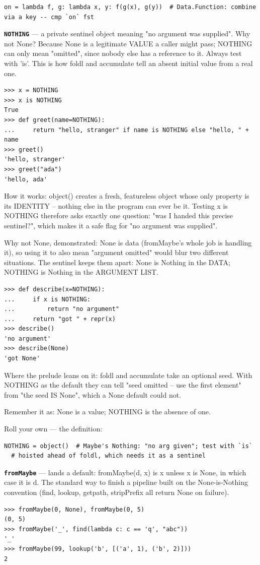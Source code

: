 \documentclass[10pt,letterpaper]{article}
\begin{document}
\begin{lstlisting}[style=ex]
on = lambda f, g: lambda x, y: f(g(x), g(y))  # Data.Function: combine via a key -- cmp `on` fst
\end{lstlisting}
\textbf{\texttt{NOTHING}} --- a private sentinel object meaning "no argument was supplied". Why not None? Because None is a legitimate VALUE a caller might pass; NOTHING can only mean "omitted", since nobody else has a reference to it. Always test with 'is'. This is how foldl and accumulate tell an absent initial value from a real one.
\begin{lstlisting}[style=ex]
>>> x = NOTHING
>>> x is NOTHING
True
>>> def greet(name=NOTHING):
...     return "hello, stranger" if name is NOTHING else "hello, " + name
>>> greet()
'hello, stranger'
>>> greet("ada")
'hello, ada'
\end{lstlisting}

How it works: object() creates a fresh, featureless object whose only property is its IDENTITY -- nothing else in the program can ever be it. Testing x is NOTHING therefore asks exactly one question: "was I handed this precise sentinel?", which makes it a safe flag for "no argument was supplied".


Why not None, demonstrated: None is data (fromMaybe's whole job is handling it), so using it to also mean "argument omitted" would blur two different situations. The sentinel keeps them apart: None is Nothing in the DATA; NOTHING is Nothing in the ARGUMENT LIST.

\begin{lstlisting}[style=ex]
>>> def describe(x=NOTHING):
...     if x is NOTHING:
...         return "no argument"
...     return "got " + repr(x)
>>> describe()
'no argument'
>>> describe(None)
'got None'
\end{lstlisting}

Where the prelude leans on it: foldl and accumulate take an optional seed. With NOTHING as the default they can tell "seed omitted -- use the first element" from "the seed IS None", which a None default could not.


Remember it as: None is a value; NOTHING is the absence of one.


Roll your own --- the definition:

\begin{lstlisting}[style=ex]
NOTHING = object()  # Maybe's Nothing: "no arg given"; test with `is`
  # hoisted ahead of foldl, which needs it as a sentinel
\end{lstlisting}
\textbf{\texttt{fromMaybe}} --- lands a default: fromMaybe(d, x) is x unless x is None, in which case it is d. The standard way to finish a pipeline built on the None-is-Nothing convention (find, lookup, getpath, stripPrefix all return None on failure).
\begin{lstlisting}[style=ex]
>>> fromMaybe(0, None), fromMaybe(0, 5)
(0, 5)
>>> fromMaybe('_', find(lambda c: c == 'q', "abc"))
'_'
>>> fromMaybe(99, lookup('b', [('a', 1), ('b', 2)]))
2
\end{lstlisting}
\end{document}
